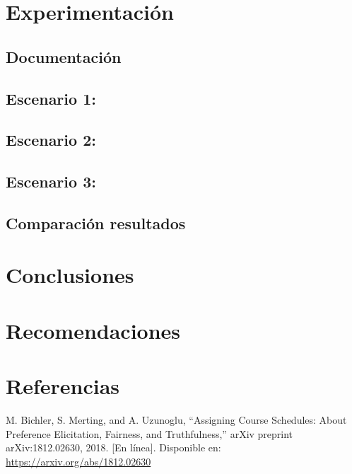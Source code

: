 \documentclass{article}
\begin{document}
\section{Experimentación}\label{sec:exp}

\subsection{Documentación}


\subsection{Escenario 1:}


\subsection{Escenario 2:}

\subsection{Escenario 3:}

\subsection{Comparación resultados}


\section{Conclusiones}\label{sec:concl}


\section{Recomendaciones}\label{secrecomen}


\section{Referencias}
\renewcommand{\refname}{}
\begin{thebibliography}{9}

 \label{ref:BPS} M. Bichler, S. Merting, and A. Uzunoglu, 
“Assigning Course Schedules: About Preference Elicitation, Fairness, and Truthfulness,” 
arXiv preprint arXiv:1812.02630, 2018. [En línea]. Disponible en: 
\url{https://arxiv.org/abs/1812.02630}



\end{thebibliography}
\end{document}
